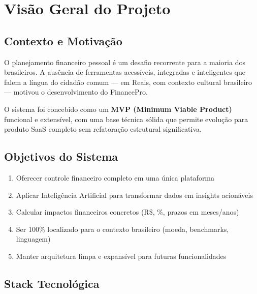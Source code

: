 \documentclass[12pt, a4paper, oneside]{report}
\begin{document}
\chapter{Visão Geral do Projeto}

\section{Contexto e Motivação}

O planejamento financeiro pessoal é um desafio recorrente para a maioria dos brasileiros. A ausência de ferramentas acessíveis, integradas e inteligentes que falem a língua do cidadão comum — em Reais, com contexto cultural brasileiro — motivou o desenvolvimento do FinancePro.

O sistema foi concebido como um \textbf{MVP (Minimum Viable Product)} funcional e extensível, com uma base técnica sólida que permite evolução para produto SaaS completo sem refatoração estrutural significativa.

\section{Objetivos do Sistema}

\begin{enumerate}
  \item Oferecer controle financeiro completo em uma única plataforma
  \item Aplicar Inteligência Artificial para transformar dados em insights acionáveis
  \item Calcular impactos financeiros concretos (R\$, \%, prazos em meses/anos)
  \item Ser 100\% localizado para o contexto brasileiro (moeda, benchmarks, linguagem)
  \item Manter arquitetura limpa e expansível para futuras funcionalidades
\end{enumerate}

\section{Stack Tecnológica}
\end{document}
